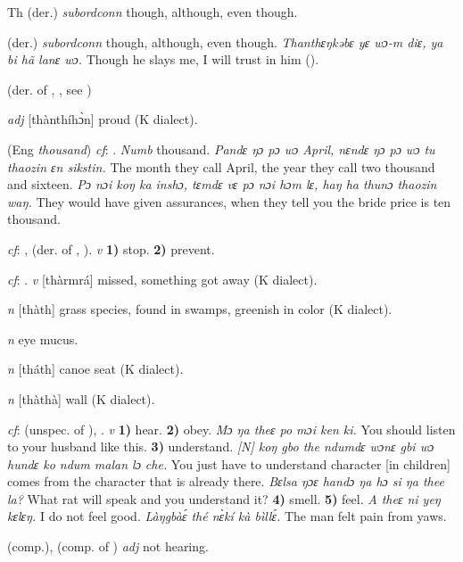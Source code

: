\begin{letter}{Th}
 (der.) \textit{subordconn} though, although, even though. 

 (der.) \textit{subordconn} though, although, even though. \textit{Thanthɛŋkəbɛ yɛ wɔ-m diɛ, ya bi hã lanɛ wɔ.} Though he slays me, I will trust in him (\citealt{Pichl1967}). 

 (der. of , , see ) 

 \textit{adj} [thànthíhɔ̀n] proud (K dialect). 

 (Eng \textit{thousand}) \textit{cf}: . \textit{Numb} thousand. \textit{Pandɛ ŋɔ pɔ wɔ April, nɛndɛ ŋɔ pɔ wɔ tu thaozin ɛn sikstin.} The month they call April, the year they call two thousand and sixteen. \textit{Pɔ nɔi koŋ ka inshɔ, tɛmdɛ vɛ pɔ nɔi hɔm lɛ, haŋ ha thunɔ thaozin waŋ.} They would have given assurances, when they tell you the bride price is ten thousand.

 \textit{cf}: ,  (der. of , ). \textit{v} \textbf{1)} stop. \textbf{2)} prevent.

 \textit{cf}: . \textit{v} [thàrmrá] missed, something got away (K dialect). 

 \textit{n} [thàth] grass species, found in swamps, greenish in color (K dialect). 

 \textit{n} eye mucus. 

 \textit{n} [tháth] canoe seat (K dialect). 

 \textit{n} [thàthà] wall (K dialect). 

 \textit{cf}:  (unspec. of ), . \textit{v} \textbf{1)} hear. \textbf{2)} obey. \textit{Mɔ ŋa theɛ po mɔi ken ki.} You should listen to your husband like this. \textbf{3)} understand. \textit{[N] koŋ gbo the ndumdɛ wɔnɛ gbi wɔ hundɛ ko ndum malan lɔ che.} You just have to understand character [in children] comes from the character that is already there. \textit{Bɛlsa ŋɔɛ handɔ ŋa hɔ si ŋa thee la?} What rat will speak and you understand it? \textbf{4)} smell. \textbf{5)} feel. \textit{A theɛ ni yeŋ kɛlɛŋ.} I do not feel good. \textit{Làŋgbàɛ́ thé nɛ̀kí kà bìllɛ́.} The man felt pain from yaws.

 (comp.), (comp. of ) \textit{adj} not hearing.


\end{letter}
